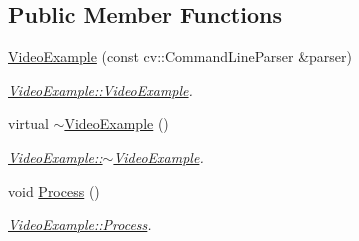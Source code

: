 \subsection*{Public Member Functions}
\begin{DoxyCompactItemize}
\item 
\mbox{\hyperlink{class_video_example_aedc40ab44835e8ad1cf731b7709cd4ac}{Video\+Example}} (const cv\+::\+Command\+Line\+Parser \&parser)
\begin{DoxyCompactList}\small\item\em \mbox{\hyperlink{class_video_example_aedc40ab44835e8ad1cf731b7709cd4ac}{Video\+Example\+::\+Video\+Example}}. \end{DoxyCompactList}\item 
virtual \mbox{\hyperlink{class_video_example_a964cdd80f93a92c7a222fc7798df19b6}{$\sim$\+Video\+Example}} ()
\begin{DoxyCompactList}\small\item\em \mbox{\hyperlink{class_video_example_a964cdd80f93a92c7a222fc7798df19b6}{Video\+Example\+::$\sim$\+Video\+Example}}. \end{DoxyCompactList}\item 
void \mbox{\hyperlink{class_video_example_a87efc66a82c36ad3380623d30a12abf2}{Process}} ()
\begin{DoxyCompactList}\small\item\em \mbox{\hyperlink{class_video_example_a87efc66a82c36ad3380623d30a12abf2}{Video\+Example\+::\+Process}}. \end{DoxyCompactList}\end{DoxyCompactItemize}
